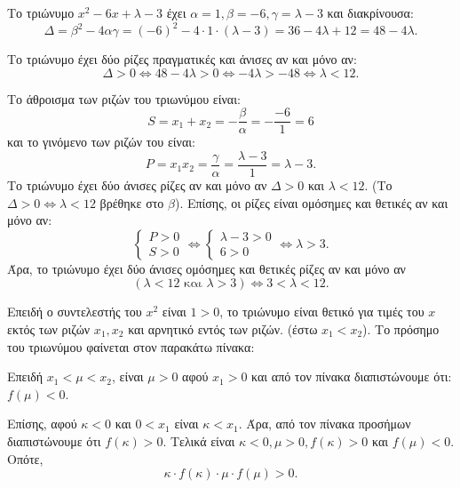 
\begin{alist}
\item Το τριώνυμο $x^2 - 6x + \lambda - 3$ έχει $\alpha = 1, \beta = -6, \gamma = \lambda - 3$ και διακρίνουσα:
\[\Delta = \beta^2 - 4\alpha\gamma = (-6)^2 - 4 \cdot 1 \cdot (\lambda - 3) = 36 - 4\lambda + 12 = 48 - 4\lambda.\]

\item Το τριώνυμο έχει δύο ρίζες πραγματικές και άνισες αν και μόνο αν:
\[\Delta > 0 \Leftrightarrow 48 - 4\lambda > 0 \Leftrightarrow -4\lambda > -48 \Leftrightarrow \lambda < 12.\]

\item 
\begin{rlist}
\item Το άθροισμα των ριζών του τριωνύμου είναι:
\[S = x_1 + x_2 = -\dfrac{\beta}{\alpha} = -\dfrac{-6}{1} = 6\]
και το γινόμενο των ριζών του είναι:
\[P = x_1 x_2 = \dfrac{\gamma}{\alpha} = \dfrac{\lambda - 3}{1} = \lambda - 3.\]
Το τριώνυμο έχει δύο άνισες ρίζες αν και μόνο αν
$\Delta > 0$ και $\lambda < 12$. (Το $\Delta > 0 \Leftrightarrow \lambda < 12$ βρέθηκε στο $\beta$).
Επίσης, οι ρίζες είναι ομόσημες και θετικές αν και μόνο αν:
\[\begin{cases} P > 0 \\ S > 0 \end{cases} \Leftrightarrow \begin{cases} \lambda - 3 > 0 \\ 6 > 0 \end{cases} \Leftrightarrow \lambda > 3.\]
Άρα, το τριώνυμο έχει δύο άνισες ομόσημες και θετικές ρίζες αν και μόνο αν
\[(\lambda < 12 \text{ και } \lambda > 3) \Leftrightarrow 3 < \lambda < 12.\]

\item Επειδή ο συντελεστής του $x^2$ είναι $1 > 0$, το τριώνυμο είναι θετικό για τιμές του $x$
εκτός των ριζών $x_1, x_2$ και αρνητικό εντός των ριζών. (έστω $x_1 < x_2$).
Το πρόσημο του τριωνύμου φαίνεται στον παρακάτω πίνακα:

\begin{center}
\end{center}

Επειδή $x_1 < \mu < x_2$, είναι $\mu > 0$ αφού $x_1 > 0$ και από τον πίνακα διαπιστώνουμε
ότι:
$f(\mu) < 0$.

Επίσης, αφού $\kappa < 0$ και $0 < x_1$ είναι $\kappa < x_1$. Άρα, από τον πίνακα προσήμων
διαπιστώνουμε ότι
$f(\kappa) > 0$.
Τελικά είναι $\kappa < 0, \mu > 0, f(\kappa) > 0$ και $f(\mu) < 0$. Οπότε,
\[\kappa \cdot f(\kappa) \cdot \mu \cdot f(\mu) > 0.\]
\end{rlist}
\end{alist}

